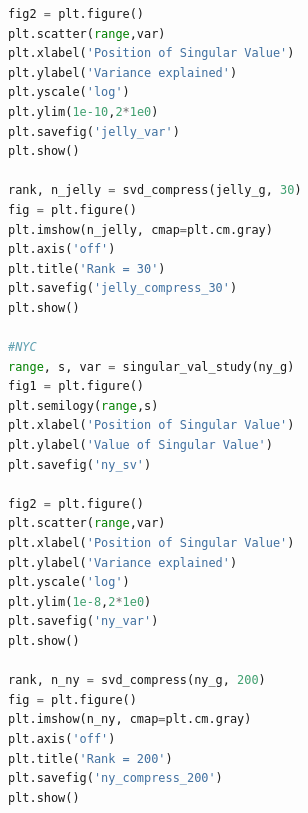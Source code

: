 \documentclass[11pt]{article}
\begin{document}
\begin{lstlisting}[language = Python]
fig2 = plt.figure()
plt.scatter(range,var)
plt.xlabel('Position of Singular Value')
plt.ylabel('Variance explained')
plt.yscale('log')
plt.ylim(1e-10,2*1e0)
plt.savefig('jelly_var')
plt.show()

rank, n_jelly = svd_compress(jelly_g, 30)
fig = plt.figure()
plt.imshow(n_jelly, cmap=plt.cm.gray)
plt.axis('off')
plt.title('Rank = 30')
plt.savefig('jelly_compress_30')
plt.show()

#NYC
range, s, var = singular_val_study(ny_g)
fig1 = plt.figure()
plt.semilogy(range,s)
plt.xlabel('Position of Singular Value')
plt.ylabel('Value of Singular Value')
plt.savefig('ny_sv')

fig2 = plt.figure()
plt.scatter(range,var)
plt.xlabel('Position of Singular Value')
plt.ylabel('Variance explained')
plt.yscale('log')
plt.ylim(1e-8,2*1e0)
plt.savefig('ny_var')
plt.show()

rank, n_ny = svd_compress(ny_g, 200)
fig = plt.figure()
plt.imshow(n_ny, cmap=plt.cm.gray)
plt.axis('off')
plt.title('Rank = 200')
plt.savefig('ny_compress_200')
plt.show()
\end{lstlisting}
\end{document}
